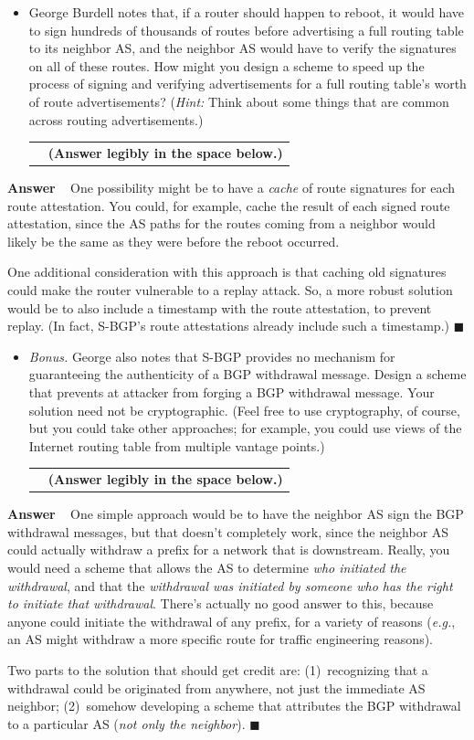 \documentclass[11pt]{article}
\newcounter{pctr}
\newcommand{\eg}{{\em e.g.}}
\newcommand{\ansbelow}{\probnote{Answer legibly in the space below.}}
\newcommand{\sols}[1]{#1}
\newcommand{\sols}[1]{}
\newcounter{answer}
\newenvironment{answer}[1][\relax]{\refstepcounter{answer}\begin{list}%
 {}{\leftmargin 0pt\rightmargin 0pt\labelsep 3pt\parsep 0pt%
 \setlength{\listparindent}{\parindent}}
    \item {\bf Answer \theanswer #1}\
    }{\hspace*{\fill}$\blacksquare$\end{list}}
\newcommand\prob[1]%
  {\begin{itemize}\item[]%
   \vspace{.2in}{\bf\thepctr. ~[#1~ points]:}\stepcounter{pctr}}
\newcommand\eprob{\end{itemize}}
\newcommand\probnote[1]%
  {\\\begin{tabular}{cr} \hspace{3in} & {\bf (#1)} \\ \end{tabular}}
\begin{document}
\pagebreak
\prob{5} George Burdell notes that, if a router should happen to reboot,
it would have to sign hundreds of thousands of routes before advertising
a full routing table to its neighbor AS, and the neighbor AS would have
to verify the signatures on all of these routes.  How might you design a
scheme to speed up the process of signing and verifying advertisements
for a full routing table's worth of route advertisements?  ({\em Hint:}
Think about some things that are common across routing advertisements.)
~\ansbelow
\eprob

\sols{
\begin{answer}
One possibility might be to have a {\em cache} of route signatures for each
route attestation.  You could, for example, cache the result of each
signed route attestation, since the AS paths for the routes coming from
a neighbor would likely be the same as they were before the reboot
occurred.  

One additional consideration with this approach is that caching old
signatures could make the router vulnerable to a replay attack.  So, a
more robust solution would be to also include a timestamp with the route
attestation, to prevent replay.  (In fact, S-BGP's route attestations
already include such a timestamp.)
\end{answer}
}

\prob{9} {\em Bonus.} George also notes that S-BGP provides no mechanism
for guaranteeing the authenticity of a BGP withdrawal message.  Design a
scheme that prevents at attacker from forging a BGP withdrawal message.
Your solution need not be cryptographic.  (Feel free to use
cryptography, of course, but you could take other approaches; for
example, you could use views of the Internet routing table from multiple
vantage points.)
~\ansbelow
\eprob

\sols{
\begin{answer}
One simple approach would be to have the neighbor AS sign the BGP
withdrawal messages, but that doesn't completely work, since the
neighbor AS could actually withdraw a prefix for a network that is
downstream.  Really, you would need a scheme that allows the AS to
determine {\em who initiated the withdrawal}, and that the {\em
  withdrawal was initiated by someone who has the right to initiate that
  withdrawal}.  There's actually no good answer to this, because anyone
could initiate the withdrawal of any prefix, for a variety of reasons
(\eg, an AS might withdraw a more specific route for traffic engineering
reasons).  

Two parts to the solution that should get credit are: (1)~recognizing
that a withdrawal could be originated from anywhere, not just the
immediate AS neighbor; (2)~somehow developing a scheme that attributes
the BGP withdrawal to a particular AS ({\em not only the neighbor}).
\end{answer}
}


\label{lastpage}
\end{document}
